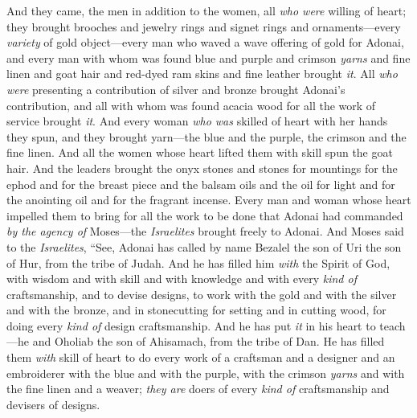 \begin{biblechapter}
\verse And they came, the men in addition to the women, all \textit{who were} willing of heart; they brought brooches and jewelry rings and signet rings and ornaments—every \textit{variety} of gold object—every man who waved a wave offering of gold for Adonai,
\verse and every man with whom was found blue and purple and crimson \textit{yarns} and fine linen and goat hair and red-dyed ram skins and fine leather brought \textit{it}.
\verse All \textit{who were} presenting a contribution of silver and bronze brought Adonai’s contribution, and all with whom was found acacia wood for all the work of service brought \textit{it}.
\verse And every woman \textit{who was} skilled of heart with her hands they spun, and they brought yarn—the blue and the purple, the crimson and the fine linen.
\verse And all the women whose heart lifted them with skill spun the goat hair.
\verse And the leaders brought the onyx stones and stones for mountings for the ephod and for the breast piece
\verse and the balsam oils and the oil for light and for the anointing oil and for the fragrant incense.
\verse Every man and woman whose heart impelled them to bring for all the work to be done that Adonai had commanded \textit{by the agency of} Moses—the \textit{Israelites} brought freely to Adonai.
\verse And Moses said to the \textit{Israelites}, “See, Adonai has called by name Bezalel the son of Uri the son of Hur, from the tribe of Judah.
\verse And he has filled him \textit{with} the Spirit of God, with wisdom and with skill and with knowledge and with every \textit{kind of} craftsmanship,
\verse and to devise designs, to work with the gold and with the silver and with the bronze,
\verse and in stonecutting for setting and in cutting wood, for doing every \textit{kind of} design craftsmanship.
\verse And he has put \textit{it} in his heart to teach—he and Oholiab the son of Ahisamach, from the tribe of Dan.
\verse He has filled them \textit{with} skill of heart to do every work of a craftsman and a designer and an embroiderer with the blue and with the purple, with the crimson \textit{yarns} and with the fine linen and a weaver; \textit{they are} doers of every \textit{kind of} craftsmanship and devisers of designs.
\end{biblechapter}

